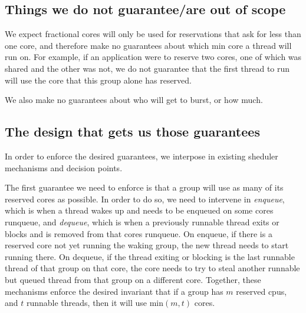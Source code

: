 
\subsection{Things we do not guarantee/are out of scope}

We expect fractional cores will only be used for reservations that ask for less
than one core, and therefore make no guarantees about which min core a thread
will run on. For example, if an application were to reserve two cores, one of
which was shared and the other was not, we do not guarantee that the first
thread to run will use the core that this group alone has reserved.

We also make no guarantees about who will get to burst, or how much.

\subsection{The design that gets us those guarantees}

In order to enforce the desired guarantees, we interpose in existing sheduler
mechanisms and decision points.


The first guarantee we need to enforce is that a group will use as many of its
reserved cores as possible. In order to do so, we need to intervene in
\textit{enqueue}, which is when a thread wakes up and needs to be enqueued on
some cores runqueue, and \textit{dequeue}, which is when a previously runnable
thread exits or blocks and is removed from that cores runqueue. On enqueue, if
there is a reserved core not yet running the waking group, the new thread needs
to start running there. On dequeue, if the thread exiting or blocking is the
last runnable thread of that group on that core, the core needs to try to steal
another runnable but queued thread from that group on a different core.
Together, these mechanisms enforce the desired invariant that if a group has $m$
reserved cpus, and $t$ runnable threads, then it will use min$(m,t)$ cores.


